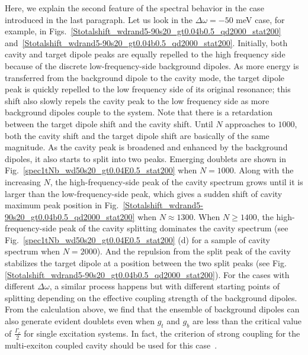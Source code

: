 Here, we explain the second feature of the spectral behavior in the case introduced in the last paragraph. Let us look in the $\Delta\omega=-50$ meV case, for example, in Figs.~\ref{Stotalshift_wdrand5-90s20_gt0.04b0.5_qd2000_stat200} and~\ref{Stotalshift_wdrand5-90s20_gt0.04b0.5_qd2000_stat200}. Initially, both cavity and target dipole peaks are equally repelled to the high frequency side because of the discrete low-frequency-side background dipoles. As more energy is transferred from the background dipole to the cavity mode, the target dipole peak is quickly repelled to the low frequency side of its original resonance; this shift also slowly repels the cavity peak to the low frequency side as more background dipoles couple to the system. Note that there is a retardation between the target dipole shift and the cavity shift. Until $N$ approaches to $1000$, both the cavity shift and the target dipole shift are basically of the same magnitude. As the cavity peak is broadened and enhanced by the background dipoles, it also starts to split into two peaks. Emerging doublets are shown in Fig.~\ref{spec1tNb_wd50s20_gt0.04E0.5_stat200} when $N=1000$. Along with the increasing $N$, the high-frequency-side peak of the cavity spectrum grows until it is larger than the low-frequency-side peak, which gives a sudden shift of cavity maximum peak position in Fig.~\ref{Stotalshift_wdrand5-90s20_gt0.04b0.5_qd2000_stat200} when $N\approx1300$. When $N\geq1400$, the high-frequency-side peak of the cavity splitting dominates the cavity spectrum (see Fig.~\ref{spec1tNb_wd50s20_gt0.04E0.5_stat200} (d) for a sample of cavity spectrum when $N=2000$). And the repulsion from the split peak of the cavity stabilizes the target dipole at a position between the two split peaks (see Fig.\ref{Stotalshift_wdrand5-90s20_gt0.04b0.5_qd2000_stat200}). For the cases with different $\Delta\omega$, a similar process happens but with different starting points of splitting depending on the effective coupling strength of the background dipoles. From the calculation above, we find that the ensemble of background dipoles can also generate evident doublets even when $g_t$ and $g_b$ are less than the critical value of $\frac{\Gamma_c}{2}$ for single excitation systems. In fact, the criterion of strong coupling for the multi-exciton coupled cavity should be used for this case~\cite{Kimble1994,Tischler2007}.



